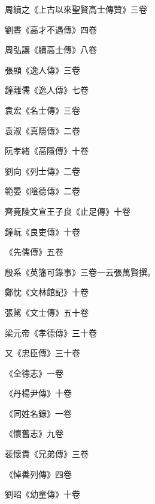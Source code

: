 \begin{pinyinscope}
 周續之《上古以來聖賢高士傳贊》三卷



 劉晝《高才不遇傳》四卷



 周弘讓《續高士傳》八卷



 張顯《逸人傳》三卷



 鐘離儒《逸人傳》七卷



 袁宏《名士傳》三卷



 袁淑《真隱傳》二卷



 阮孝緒《高隱傳》十卷



 劉向《列士傳》二卷



 範晏《陰德傳》二卷



 齊竟陵文宣王子良《止足傳》十卷



 鐘岏《良吏傳》十卷



 《先儒傳》五卷



 殷系《英籓可錄事》三卷一云張萬賢撰。



 鄭忱《文林館記》十卷



 張騭《文士傳》五十卷



 梁元帝《孝德傳》三十卷



 又《忠臣傳》三十卷



 《全德志》一卷



 《丹楊尹傳》十卷



 《同姓名錄》一卷



 《懷舊志》九卷



 裴懷貴《兄弟傳》三卷



 《悼善列傳》四卷



 劉昭《幼童傳》十卷




\end{pinyinscope}
